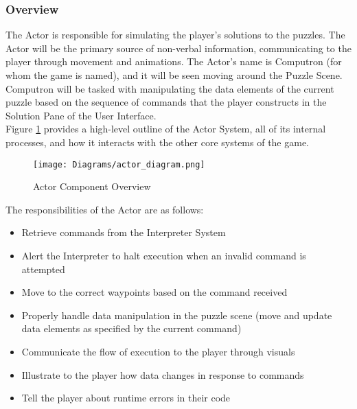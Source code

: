 \subsubsection{Overview}
The Actor is responsible for simulating the player's solutions to the puzzles.  The Actor will be the primary source of non-verbal information, communicating 
to the player through movement and animations. The Actor's name is Computron (for whom the game is named), and it will be seen moving around the Puzzle Scene. Computron will be tasked with manipulating the data elements of the current puzzle based on the sequence of commands that the player constructs in the Solution Pane of the User Interface.\\

Figure \ref{fig:actor_diagram} provides a high-level outline of the Actor System, all of its internal processes, and how it interacts with the other core systems of the game. \\

\begin{figure}[!htb]
  \caption{Actor Component Overview}
  \label{fig:actor_diagram}
  \centering
  \texttt{[image: Diagrams/actor\_diagram.png]}
\end{figure}
\newpage
The responsibilities of the Actor are as follows:

\begin{itemize}
	\item Retrieve commands from the Interpreter System
	\item Alert the Interpreter to halt execution when an invalid command is attempted
	\item Move to the correct waypoints based on the command received
	\item Properly handle data manipulation in the puzzle scene (move and update data elements
			as specified by the current command)
	\item Communicate the flow of execution to the player through visuals
	\item Illustrate to the player how data changes in response to commands
	\item Tell the player about runtime errors in their code
\end{itemize}

